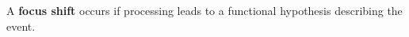 \begin{defn}\label{def:interest}
  \hypertarget{def:interest}{} A \textbf{focus shift} occurs if processing leads to a functional hypothesis describing the event.
\end{defn}


                                         
